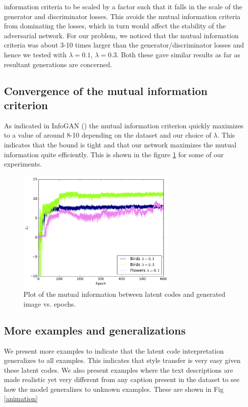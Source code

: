 \documentclass{article}
\begin{document}
\begin{itemize}
information criteria to be scaled by a factor such that it falls
        in the scale of the generator and discriminator losses. This avoids the
        mutual information criteria from dominating the losses, which in turn
        would affect the stability of the adversarial network. For our problem, we noticed that the
        mutual information criteria was about 3-10 times larger than the
        generator/discriminator losses and hence we tested with $\lambda = 0.1$,
        $\lambda = 0.3$. Both these gave similar results as far as resultant
        generations are concerned.
\end{itemize}

\subsection{Convergence of the mutual information criterion}
As indicated in InfoGAN (\cite{infogan}) the mutual information criterion quickly maximizes to
a value of around 8-10 depending on the dataset and our choice of $\lambda$.
This indicates that the bound is tight and that our network maximizes the mutual
information quite efficiently. This is shown in the figure \ref{fig:miplot} for some of our
experiments.
\begin{figure}
\centering
\includegraphics[width=0.7\textwidth]{miplot}
\caption{Plot of the mutual information between latent codes and generated image vs. epochs.}
\label{fig:miplot}
\end{figure}
\subsection{More examples and generalizations}
We present more examples to indicate that the latent code interpretation
generalizes to all examples. This indicates that style transfer is very easy
given these latent codes. We also present examples where the text descriptions
are made realistic yet very different from any caption present in the dataset to
see how the model generalizes to unknown examples. These are shown in Fig
\ref{animation}
\end{document}
